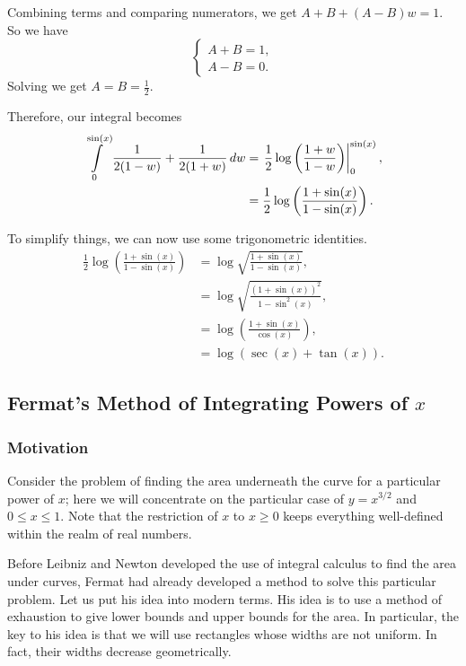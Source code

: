 Combining terms and comparing numerators, we get \(A + B + (A - B)w = 1\). So we have
\begin{equation}
\begin{cases}
A + B = 1, \\
A - B = 0.
\end{cases}
\end{equation}
Solving we get \(A = B = \frac{1}{2}\).

Therefore, our integral becomes
\begin{align}
\int\limits_0^{\sin(x)} \frac{1}{2(1 - w)} + \frac{1}{2(1 + w)} \, dw 
    & = \left. \frac{1}{2} \log\left(\frac{1 + w}{1 - w}\right)\right|_0^{\sin(x)}, \\
    & = \frac{1}{2} \log\left(\frac{1 + \sin(x)}{1 - \sin(x)}\right).
\end{align}

To simplify things, we can now use some trigonometric identities.
\begin{align}
\frac{1}{2} \log\left(\frac{1 + \sin(x)}{1 - \sin(x)}\right) & = \log\sqrt{\frac{1 + \sin(x)}{1 - \sin(x)}}, \\
    & = \log\sqrt{\frac{(1 + \sin(x))^2}{1 - \sin^2(x)}}, \\
    & = \log\left(\frac{1 + \sin(x)}{\cos(x)}\right), \\
    & = \log(\sec(x) + \tan(x)).
\end{align}


\subsection{Fermat's Method of Integrating Powers of \(x\)}

\subsubsection*{Motivation}

Consider the problem of finding the area underneath the curve for a particular power of \(x\); here we will concentrate on the 
particular case of \(y = x^{3/2}\) and \(0 \leq x \leq 1\). Note that the restriction of \(x\) to \(x\geq 0\) keeps everything well-defined within
the realm of real numbers. 

Before Leibniz and Newton developed the use of integral calculus to find the area under curves, Fermat had already developed 
a method to solve this particular problem. Let us put his idea into modern terms. His idea is to use a method of exhaustion to 
give lower bounds and upper bounds for the area. In particular, the key to his idea is that we will use rectangles whose widths
are not uniform. In fact, their widths decrease geometrically. 

